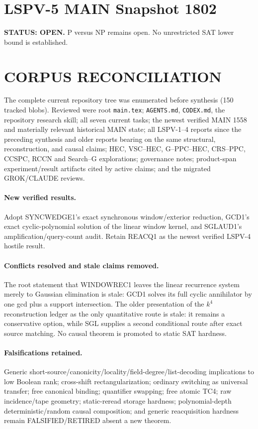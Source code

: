 \documentclass[11pt]{article}
\begin{document}
\section*{LSPV-5 MAIN Snapshot 1802}
\textbf{STATUS: OPEN.} P versus NP remains open. No unrestricted SAT lower bound is established.

\section*{CORPUS RECONCILIATION}
The complete current repository tree was enumerated before synthesis (150 tracked blobs). Reviewed were root \texttt{main.tex}; \texttt{AGENTS.md}, \texttt{CODEX.md}, the repository research skill; all seven current tasks; the newest verified MAIN 1558 and materially relevant historical MAIN state; all LSPV-1--4 reports since the preceding synthesis and older reports bearing on the same structural, reconstruction, and causal claims; HEC, VSC--HEC, G--PPC--HEC, CRS--PPC, CCSPC, RCCN and Search--G explorations; governance notes; product-span experiment/result artifacts cited by active claims; and the migrated GROK/CLAUDE reviews.

\paragraph{New verified results.}
Adopt SYNCWEDGE1's exact synchronous window/exterior reduction, GCD1's exact cyclic-polynomial solution of the linear window kernel, and SGLAUD1's amplification/query-count audit. Retain REACQ1 as the newest verified LSPV-4 hostile result.

\paragraph{Conflicts resolved and stale claims removed.}
The root statement that WINDOWREC1 leaves the linear recurrence system merely to Gaussian elimination is stale: GCD1 solves its full cyclic annihilator by one gcd plus a support intersection. The older presentation of the \(k^4\) reconstruction ledger as the only quantitative route is stale: it remains a conservative option, while SGL supplies a second conditional route after exact source matching. No causal theorem is promoted to static SAT hardness.

\paragraph{Falsifications retained.}
Generic short-source/canonicity/locality/field-degree/list-decoding implications to low Boolean rank; cross-shift rectangularization; ordinary switching as universal transfer; free canonical binding; quantifier swapping; free atomic TC4; raw incidence/tape geometry; static-reread storage hardness; polynomial-depth deterministic/random causal composition; and generic reacquisition hardness remain FALSIFIED/RETIRED absent a new theorem.
\end{document}
